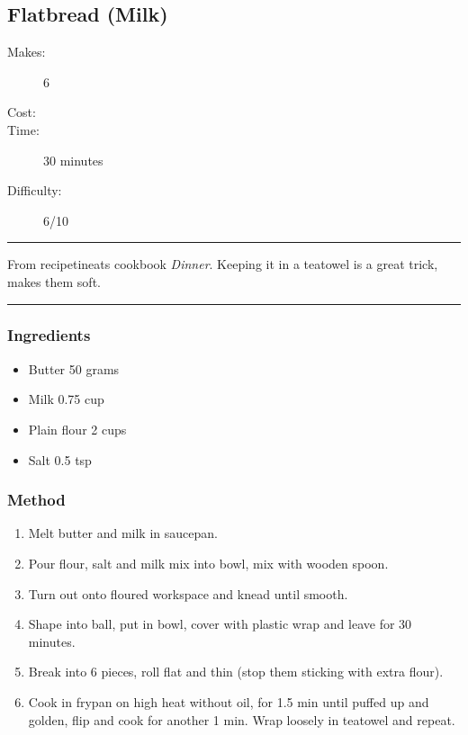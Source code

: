 \documentclass[]{article}
\begin{document}
\subsection*{\center\huge Flatbread (Milk)}
\begin{description}
\item[Makes:] 6 
\item[Cost:] \textdollar
\item[Time:] 30 minutes
\item[Difficulty:] 6/10
\end{description}
\vspace{0.2cm}\hrule\vspace{0.5cm}
\begin{adjustwidth}{0.5 cm}{0.5 cm}

From recipetineats cookbook \textit{Dinner}. Keeping it in a teatowel is a great trick, makes them soft. \hfill{}\color{black}

\end{adjustwidth}
\vspace{0.5cm}\hrule
\subsubsection*{\Large Ingredients}
\begin{multicols}{2}
\begin{itemize}
 \item Butter \hfill 50 grams
 \item Milk \hfill 0.75 cup
 \item Plain flour \hfill 2 cups
 \item Salt \hfill 0.5 tsp
\end{itemize}
\end{multicols}
\subsubsection*{\Large Method}
\begin{enumerate}[font=\huge\color{accent}]
	\item Melt butter and milk in saucepan.
	\item Pour flour, salt and milk mix into bowl, mix with wooden spoon.
	\item Turn out onto floured workspace and knead until smooth.
	\item Shape into ball, put in bowl, cover with plastic wrap and leave for 30 minutes.
	\item Break into 6 pieces, roll flat and thin (stop them sticking with extra flour).
	\item Cook in frypan on high heat without oil, for 1.5 min until puffed up and golden, flip and cook for another 1 min. Wrap loosely in teatowel and repeat.
\end{enumerate}
\newpage
{}\label{rec:Flatbread (Yoghurt)}
\end{document}

